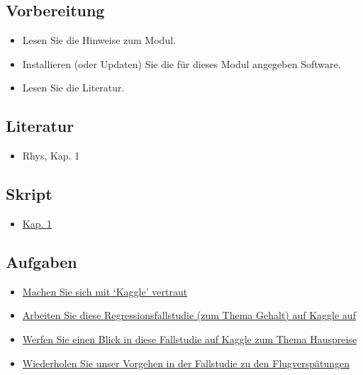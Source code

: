 \documentclass[
]{book}
\providecommand{\tightlist}{%
  \setlength{\itemsep}{0pt}\setlength{\parskip}{0pt}}
\begin{document}
\hypertarget{vorbereitung}{%
\subsection{Vorbereitung}\label{vorbereitung}}

\begin{itemize}
\tightlist
\item
  Lesen Sie die Hinweise zum Modul.
\item
  Installieren (oder Updaten) Sie die für dieses Modul angegeben Software.
\item
  Lesen Sie die Literatur.
\end{itemize}

\hypertarget{literatur-1}{%
\subsection{Literatur}\label{literatur-1}}

\begin{itemize}
\tightlist
\item
  Rhys, Kap. 1
\end{itemize}

\hypertarget{skript}{%
\subsection{Skript}\label{skript}}

\begin{itemize}
\tightlist
\item
  \href{}{Kap. 1}
\end{itemize}

\hypertarget{aufgaben}{%
\subsection{Aufgaben}\label{aufgaben}}

\begin{itemize}
\tightlist
\item
  \href{https://www.kaggle.com/}{Machen Sie sich mit `Kaggle' vertraut}
\item
  \href{https://www.kaggle.com/pranjalpandey12/performing-simple-linear-regression-in-r}{Arbeiten Sie diese Regressionsfallstudie (zum Thema Gehalt) auf Kaggle auf}
\item
  \href{https://www.kaggle.com/lazaro97/data-preprocessing-and-linear-regression-with-r}{Werfen Sie einen Blick in diese Fallstudie auf Kaggle zum Thema Hauspreise}
\item
  \href{https://data-se.netlify.app/2021/03/10/fallstudie-modellierung-von-flugversp\%C3\%A4tungen/}{Wiederholen Sie unser Vorgehen in der Fallstudie zu den Flugverspätungen}
\end{itemize}
\end{document}
